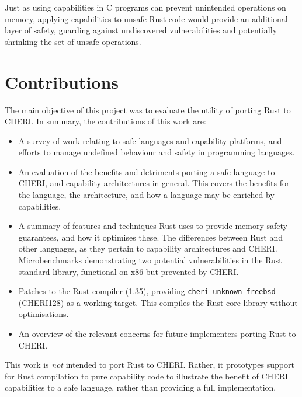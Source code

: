 \documentclass[dissertation.tex]{subfiles}
\begin{document}
Just as using capabilities in C programs can prevent unintended operations on memory, applying capabilities to unsafe Rust code would provide an additional layer of safety, guarding against undiscovered vulnerabilities and potentially shrinking the set of unsafe operations.


\section{Contributions}
\label{sec:intro-contrib}

The main objective of this project was to evaluate the utility of
porting Rust to CHERI.
In summary, the contributions of this work are:


\begin{itemize}
    \item A survey of work relating to safe languages and capability
    platforms, and efforts to manage undefined behaviour and safety in
    programming languages.
    \item An evaluation of the benefits and detriments porting a safe
    language to CHERI, and capability architectures in general.
    This covers the benefits for the language, the architecture, and how
    a language may be enriched by capabilities.
    \item A summary of features and techniques Rust uses to provide
    memory safety guarantees, and how it optimises these.
    The differences between Rust and other languages, as they pertain to
    capability architectures and CHERI.
    Microbenchmarks demonstrating two potential vulnerabilities in
    the Rust standard library, functional on x86 but prevented by CHERI.
    \item Patches to the Rust compiler (1.35), providing
    \texttt{cheri-unknown-freebsd} (CHERI128) as a working target.
    This compiles the Rust core library without optimisations.
    \item An overview of the relevant concerns for future implementers
    porting Rust to CHERI.
\end{itemize}

This work is \emph{not} intended to port Rust to CHERI.
Rather, it prototypes support for Rust compilation to pure capability
 code to illustrate the benefit of CHERI
capabilities to a safe language, rather than providing a full
implementation.
\end{document}
